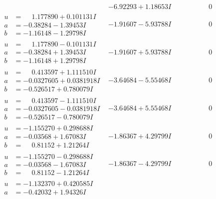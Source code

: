 \documentclass[1p]{elsarticle_modified}
\theoremstyle{definition}
\begin{document}
$$\begin{array}{c|c|c}
 & -6.92293 + 1.18653 I & \phantom{-0.000000 } 0 \\ \hline\begin{aligned}
u &= \phantom{-}1.177890 + 0.101131 I \\
a &= -0.38284 - 1.39453 I \\
b &= -1.16148 - 1.29798 I\end{aligned}
 & -1.91607 - 5.93788 I & \phantom{-0.000000 } 0 \\ \hline\begin{aligned}
u &= \phantom{-}1.177890 - 0.101131 I \\
a &= -0.38284 + 1.39453 I \\
b &= -1.16148 + 1.29798 I\end{aligned}
 & -1.91607 + 5.93788 I & \phantom{-0.000000 } 0 \\ \hline\begin{aligned}
u &= \phantom{-}0.413597 + 1.111510 I \\
a &= -0.0327605 + 0.0381918 I \\
b &= -0.526517 + 0.780079 I\end{aligned}
 & -3.64684 - 5.55468 I & \phantom{-0.000000 } 0 \\ \hline\begin{aligned}
u &= \phantom{-}0.413597 - 1.111510 I \\
a &= -0.0327605 - 0.0381918 I \\
b &= -0.526517 - 0.780079 I\end{aligned}
 & -3.64684 + 5.55468 I & \phantom{-0.000000 } 0 \\ \hline\begin{aligned}
u &= -1.155270 + 0.298688 I \\
a &= -0.03568 + 1.67083 I \\
b &= \phantom{-}0.81152 + 1.21264 I\end{aligned}
 & -1.86367 + 4.29799 I & \phantom{-0.000000 } 0 \\ \hline\begin{aligned}
u &= -1.155270 - 0.298688 I \\
a &= -0.03568 - 1.67083 I \\
b &= \phantom{-}0.81152 - 1.21264 I\end{aligned}
 & -1.86367 - 4.29799 I & \phantom{-0.000000 } 0 \\ \hline\begin{aligned}
u &= -1.132370 + 0.420585 I \\
a &= -0.42032 + 1.94326 I \\

\end{aligned}
\end{array}$$
\end{document}
